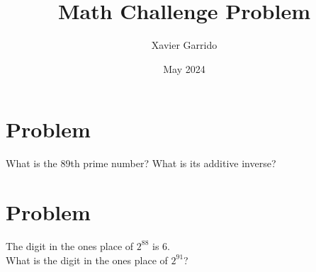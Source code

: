 \documentclass{article}
\title{Math Challenge Problem}
\author{Xavier Garrido}
\date{May 2024}
\begin{document}
\maketitle

\setcounter{section}{1}
\section{Problem}

What is the 89th prime number?
What is its additive inverse?

\section{Problem}

The digit in the ones place of $2^{88}$ is 6.\\
What is the digit in the ones place of $2^{91}$?


\newpage
\end{document}
